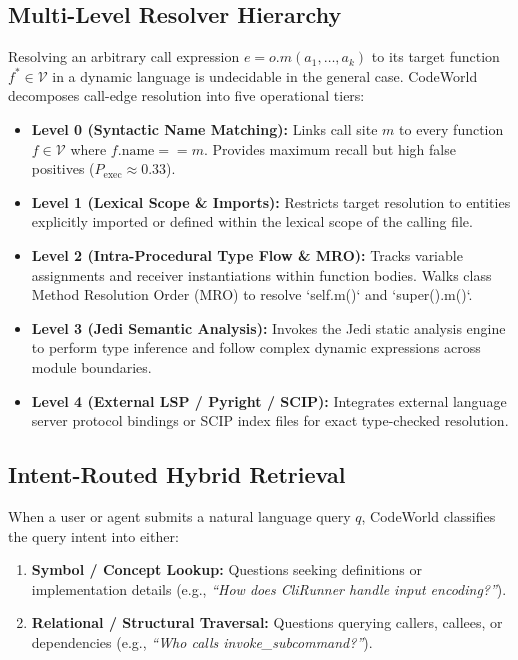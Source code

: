\documentclass[conference]{IEEEtran}
\begin{document}
\subsection{Multi-Level Resolver Hierarchy}
Resolving an arbitrary call expression $e = o.m(a_1, \dots, a_k)$ to its target function $f^* \in \mathcal{V}$ in a dynamic language is undecidable in the general case. CodeWorld decomposes call-edge resolution into five operational tiers:
\begin{itemize}
    \item \textbf{Level 0 (Syntactic Name Matching):} Links call site $m$ to every function $f \in \mathcal{V}$ where $f.\text{name} == m$. Provides maximum recall but high false positives ($P_{\text{exec}} \approx 0.33$).
    \item \textbf{Level 1 (Lexical Scope \& Imports):} Restricts target resolution to entities explicitly imported or defined within the lexical scope of the calling file.
    \item \textbf{Level 2 (Intra-Procedural Type Flow \& MRO):} Tracks variable assignments and receiver instantiations within function bodies. Walks class Method Resolution Order (MRO) to resolve `self.m()` and `super().m()`.
    \item \textbf{Level 3 (Jedi Semantic Analysis):} Invokes the Jedi static analysis engine to perform type inference and follow complex dynamic expressions across module boundaries.
    \item \textbf{Level 4 (External LSP / Pyright / SCIP):} Integrates external language server protocol bindings or SCIP index files for exact type-checked resolution.
\end{itemize}

\subsection{Intent-Routed Hybrid Retrieval}
When a user or agent submits a natural language query $q$, CodeWorld classifies the query intent into either:
\begin{enumerate}
    \item \textbf{Symbol / Concept Lookup:} Questions seeking definitions or implementation details (e.g., \textit{``How does CliRunner handle input encoding?''}).
    \item \textbf{Relational / Structural Traversal:} Questions querying callers, callees, or dependencies (e.g., \textit{``Who calls invoke\_subcommand?''}).
\end{enumerate}
\end{document}
